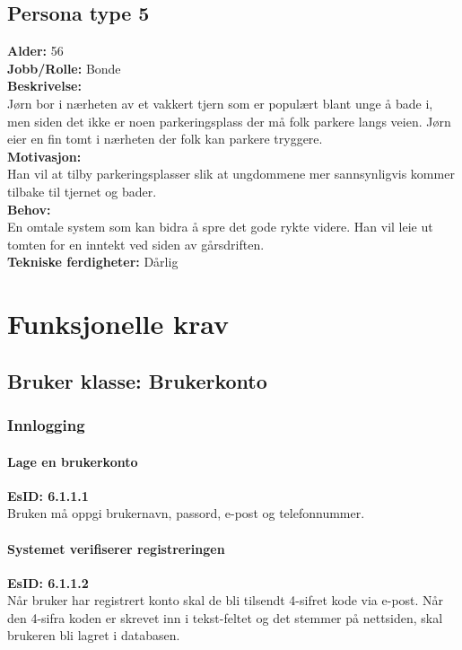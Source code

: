 \documentclass[12pt]{article}
\begin{document}
    \subsection{Persona type 5}
    \textbf{Alder:} 56\\\textbf{Jobb/Rolle:} Bonde\\\textbf{Beskrivelse:}\\Jørn bor i nærheten av et vakkert tjern som er populært blant unge å bade i, men siden det ikke er noen parkeringsplass der må folk parkere langs veien. Jørn eier en fin tomt i nærheten der folk kan parkere tryggere.\\\textbf{Motivasjon:}\\Han vil at tilby parkeringsplasser slik at ungdommene mer sannsynligvis kommer tilbake til tjernet og bader.\\\textbf{Behov:}\\En omtale system som kan bidra å spre det gode rykte videre. Han vil leie ut tomten for en inntekt ved siden av gårsdriften.\\\textbf{Tekniske ferdigheter:} Dårlig

\section{Funksjonelle krav}

    \subsection{Bruker klasse: Brukerkonto}

        \subsubsection{Innlogging}
        
            \paragraph{Lage en brukerkonto}
            \textbf{EsID: 6.1.1.1}\\Bruken må oppgi brukernavn, passord, e-post og telefonnummer.

            \paragraph{Systemet verifiserer registreringen}
            \textbf{EsID: 6.1.1.2}\\Når bruker har registrert konto skal de bli tilsendt 4-sifret kode via e-post. Når den 4-sifra koden er skrevet inn i tekst-feltet og det stemmer på nettsiden, skal brukeren bli lagret i databasen.
\end{document}
